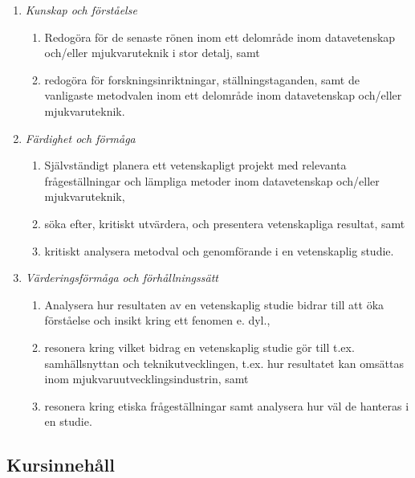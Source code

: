 \begin{enumerate}
\def\labelenumi{\Alph{enumi}.}
\tightlist
\item
  \emph{Kunskap och förståelse}

  \begin{enumerate}
  \def\labelenumii{\Alph{enumi}.\arabic{enumii}.}
  \tightlist
  \item
    Redogöra för de senaste rönen inom ett delområde inom datavetenskap
    och/eller mjukvaruteknik i stor detalj, samt
  \item
    redogöra för forskningsinriktningar, ställningstaganden, samt de
    vanligaste metodvalen inom ett delområde inom datavetenskap
    och/eller mjukvaruteknik.
  \end{enumerate}
\item
  \emph{Färdighet och förmåga}

  \begin{enumerate}
  \def\labelenumii{\Alph{enumi}.\arabic{enumii}.}
  \tightlist
  \item
    Självständigt planera ett vetenskapligt projekt med relevanta
    frågeställningar och lämpliga metoder inom datavetenskap och/eller
    mjukvaruteknik,
  \item
    söka efter, kritiskt utvärdera, och presentera vetenskapliga
    resultat, samt
  \item
    kritiskt analysera metodval och genomförande i en vetenskaplig
    studie.
  \end{enumerate}
\item
  \emph{Värderingsförmåga och förhållningssätt}

  \begin{enumerate}
  \def\labelenumii{\Alph{enumi}.\arabic{enumii}.}
  \tightlist
  \item
    Analysera hur resultaten av en vetenskaplig studie bidrar till att
    öka förståelse och insikt kring ett fenomen e. dyl.,
  \item
    resonera kring vilket bidrag en vetenskaplig studie gör till t.ex.
    samhällsnyttan och teknikutvecklingen, t.ex. hur resultatet kan
    omsättas inom mjukvaruutvecklingsindustrin, samt
  \item
    resonera kring etiska frågeställningar samt analysera hur väl de
    hanteras i en studie.
  \end{enumerate}
\end{enumerate}

\subsection*{Kursinnehåll}

